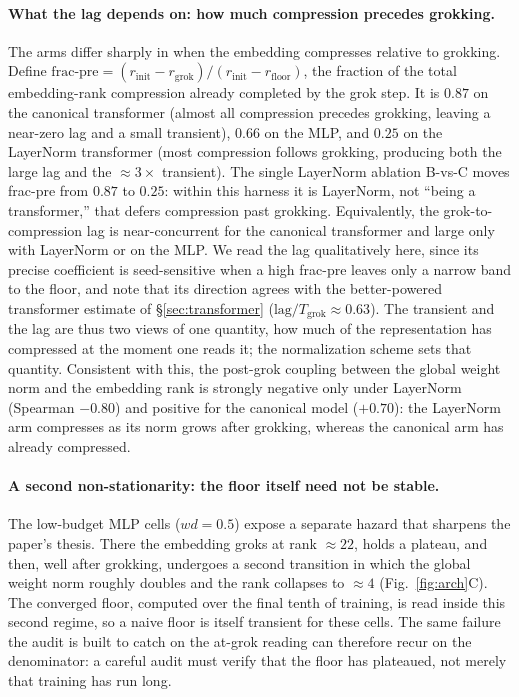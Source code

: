 \documentclass[11pt]{article}
\begin{document}
\paragraph{What the lag depends on: how much compression precedes grokking.} The arms differ sharply in
when the embedding compresses relative to grokking. Define $\mathrm{frac\text{-}pre} =
(r_{\mathrm{init}}-r_{\mathrm{grok}})/(r_{\mathrm{init}}-r_{\mathrm{floor}})$, the fraction of the total
embedding-rank compression already completed by the grok step. It is $0.87$ on the canonical transformer
(almost all compression precedes grokking, leaving a near-zero lag and a small transient), $0.66$ on the
MLP, and $0.25$ on the LayerNorm transformer (most compression follows grokking, producing both the large
lag and the $\approx\!3\times$ transient). The single LayerNorm ablation B-vs-C moves frac-pre from $0.87$
to $0.25$: within this harness it is LayerNorm, not ``being a transformer,'' that defers compression past
grokking. Equivalently, the grok-to-compression lag is near-concurrent for the canonical transformer and
large only with LayerNorm or on the MLP. We read the lag qualitatively here, since its precise coefficient is
seed-sensitive when a high frac-pre leaves only a narrow band to the floor, and note that its
direction agrees with the better-powered transformer estimate of \S\ref{sec:transformer}
($\mathrm{lag}/T_{\mathrm{grok}}\approx0.63$). The transient and the lag are thus two views of one
quantity, how much of the representation has compressed at the moment one reads it; the normalization
scheme sets that quantity. Consistent with this, the post-grok coupling between the global weight norm and
the embedding rank is strongly negative only under LayerNorm (Spearman $-0.80$) and positive for the
canonical model ($+0.70$): the LayerNorm arm compresses as its norm grows after grokking, whereas the
canonical arm has already compressed.

\paragraph{A second non-stationarity: the floor itself need not be stable.} The low-budget MLP cells
($wd=0.5$) expose a separate hazard that sharpens the paper's thesis. There the embedding groks at rank
$\approx\!22$, holds a plateau, and then, well after grokking, undergoes a second transition in which
the global weight norm roughly doubles and the rank collapses to $\approx\!4$ (Fig.~\ref{fig:arch}C). The
converged floor, computed over the final tenth of training, is read inside this second regime, so a naive
floor is itself transient for these cells. The same failure the audit is built to catch on the at-grok
reading can therefore recur on the denominator: a careful audit must verify that the floor has plateaued,
not merely that training has run long.
\end{document}
